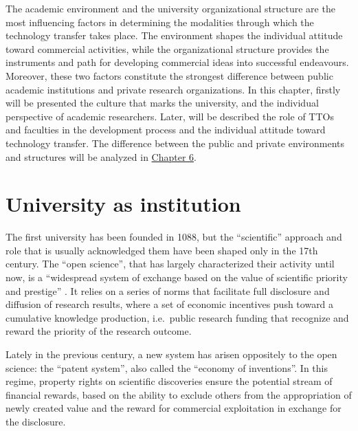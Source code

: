 

\label{Chapter2} %

The academic environment and the university organizational structure are the most influencing factors in determining the modalities through which the technology transfer takes place. The environment shapes the individual attitude toward commercial activities, while the organizational structure provides the instruments and path for developing commercial ideas into successful endeavours. Moreover, these two factors constitute the strongest difference between public academic institutions and private research organizations. In this chapter, firstly will be presented the culture that marks the university, and the individual perspective of academic researchers. Later, will be described the role of TTOs and faculties in the development process and the individual attitude toward technology transfer. The difference between the public and private environments and structures will be analyzed in \hyperref[Chapter6]{Chapter 6}.

\section{University as institution}

The first university has been founded in 1088, but the \enquote{scientific} approach and role that is usually acknowledged them have been shaped only in the 17th century. The \enquote{open science}, that has largely characterized their activity until now, is a \enquote{widespread system of exchange based on the value of scientific priority and prestige} \citep{Murray2005}. It relies on a series of norms that facilitate full disclosure and diffusion of research results, where a set of economic incentives push toward a cumulative knowledge production, i.e.\ public research funding that recognize and reward the priority of the research outcome.

Lately in the previous century, a new system has arisen oppositely to the open science: the \enquote{patent system}, also called the \enquote{economy of inventions}. In this regime, property rights on scientific discoveries ensure the potential stream of financial rewards, based on the ability to exclude others from the appropriation of newly created value and the reward for commercial exploitation in exchange for the disclosure. 

